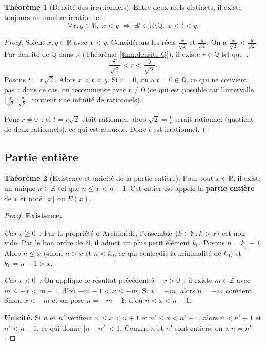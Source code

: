 \documentclass[12pt,a4paper,openany]{book}
\theoremstyle{definition}
\newtheorem{theoreme}{Théorème}[chapter]
\newcommand{\N}{\mathbb{N}}
\newcommand{\Z}{\mathbb{Z}}
\newcommand{\Q}{\mathbb{Q}}
\newcommand{\R}{\mathbb{R}}
\newcommand{\abs}[1]{\left\lvert #1 \right\rvert}
\begin{document}
\begin{theoreme}[Densité des irrationnels]\label{thm:densite-irr}
  Entre deux réels distincts, il existe toujours un nombre irrationnel~:
  \[
    \forall x, y \in \R,\; x < y \;\Rightarrow\; \exists t \in \R \setminus \Q,\; x < t < y.
  \]
\end{theoreme}

\begin{proof}
  Soient $x, y \in \R$ avec $x < y$. Considérons les réels $\frac{x}{\sqrt{2}}$ et $\frac{y}{\sqrt{2}}$. On a $\frac{x}{\sqrt{2}} < \frac{y}{\sqrt{2}}$. Par densité de $\Q$ dans $\R$ (Théorème~\ref{thm:densite-Q}), il existe $r \in \Q$ tel que~:
  \[
    \frac{x}{\sqrt{2}} < r < \frac{y}{\sqrt{2}}.
  \]
  Posons $t = r\sqrt{2}$. Alors $x < t < y$. Si $r = 0$, on a $t = 0 \in \Q$, ce qui ne convient pas~; dans ce cas, on recommence avec $r \neq 0$ (ce qui est possible car l'intervalle $]\frac{x}{\sqrt{2}}, \frac{y}{\sqrt{2}}[$ contient une infinité de rationnels).

  Pour $r \neq 0$~: si $t = r\sqrt{2}$ était rationnel, alors $\sqrt{2} = \frac{t}{r}$ serait rationnel (quotient de deux rationnels), ce qui est absurde. Donc $t$ est irrationnel.
\end{proof}

\subsection{Partie entière}

\begin{theoreme}[Existence et unicité de la partie entière]\label{thm:partie-entiere}
  Pour tout $x \in \R$, il existe un unique $n \in \Z$ tel que $n \leq x < n + 1$. Cet entier est appelé la \textbf{partie entière} de $x$ et noté $\lfloor x \rfloor$ ou $E(x)$.
\end{theoreme}

\begin{proof}
  \textbf{Existence.}

  \emph{Cas $x \geq 0$~:} Par la propriété d'Archimède, l'ensemble $\{k \in \N : k > x\}$ est non vide. Par le bon ordre de $\N$, il admet un plus petit élément $k_0$. Posons $n = k_0 - 1$. Alors $n \leq x$ (sinon $n > x$ et $n < k_0$, ce qui contredit la minimalité de $k_0$) et $k_0 = n + 1 > x$.

  \emph{Cas $x < 0$~:} On applique le résultat précédent à $-x > 0$~: il existe $m \in \Z$ avec $m \leq -x < m+1$, d'où $-m-1 < x \leq -m$. Si $x = -m$, alors $n = -m$ convient. Sinon $x < -m$ et on pose $n = -m-1$, d'où $n < x < n+1$.

  \textbf{Unicité.} Si $n$ et $n'$ vérifient $n \leq x < n+1$ et $n' \leq x < n'+1$, alors $n < n'+1$ et $n' < n+1$, ce qui donne $\abs{n - n'} < 1$. Comme $n$ et $n'$ sont entiers, on a $n = n'$.
\end{proof}
\end{document}
